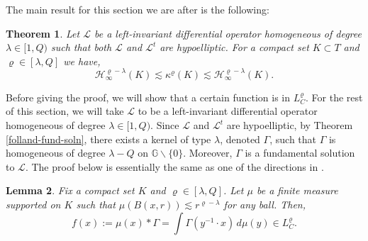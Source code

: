\documentclass[12pt,a4paper,reqno]{amsart}
\newcommand{\cg}{\Gamma}
\renewcommand{\L}{\mathcal{L}}
\renewcommand{\k}{\kappa}
\renewcommand{\l}{\lambda}
\newcommand{\G}{\mathbb{G}}
\newcommand{\h}{\mathcal{H}_{\infty}}
\numberwithin{equation}{section}
\newtheorem{thm}{Theorem}[section]
\newtheorem{lem}[thm]{Lemma}
\theoremstyle{definition}
\begin{document}
The main result for this section we are after is the following:
\begin{thm}\label{main_result}
Let $\L$ be a left-invariant differential operator homogeneous of degree $\l \in [1,Q)$ such that both $\L$ and $\L^t$ are hypoelliptic. For a compact set $K \subset T$ and $\varrho \in [\l , Q]$ we have, $$\h^{\varrho-\lambda}(K) \lesssim \k^{\varrho}(K) \lesssim \h^{\varrho-\l}(K).$$    
\end{thm}
Before giving the proof, we will show that a certain function is in $L_C^{\varrho}$. For the rest of this section, we will take $\L$ to be a left-invariant differential operator homogeneous of degree $\l \in [1, Q)$. Since $\L$ and $\L^t$ are hypoelliptic, by Theorem \ref{folland-fund-soln}, there exists a kernel of type $\l$, denoted $\cg$, such that $\cg$ is  homogeneous of degree $\l-Q$ on $\G \backslash \{0\}$. Moreover, $\cg$ is a fundamental solution to $\L$. The proof below is essentially the same as one of the directions in \cite[Theorem 4.4]{CT}. 


\begin{lem}\label{conv_is_in_L_C}
Fix a compact set $K$ and $\varrho \in [\l , Q]$. Let $\mu$ be a finite measure supported on $K$ such that $\mu(B(x,r)) \lesssim r^{\varrho - \l}$ for any ball. Then, $$f(x) :=  \mu(x) \ast \cg =  \int \cg(y^{-1} \cdot x)\,d\mu(y) \in L_C^{\varrho}.$$
\end{lem}
\end{document}

